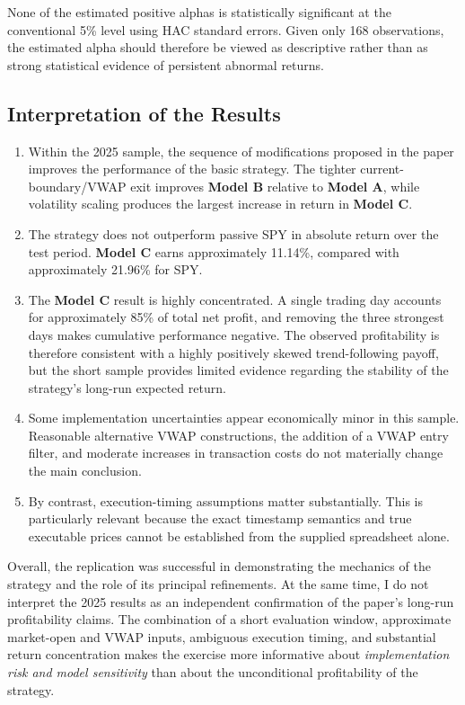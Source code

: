 \documentclass{article}
\begin{document}
None of the estimated positive alphas is statistically significant at the conventional 5\% level using HAC standard errors. Given only 168 observations, the estimated alpha should therefore be viewed as descriptive rather than as strong statistical evidence of persistent abnormal returns.

\subsection{Interpretation of the Results}
\begin{enumerate}
    \item Within the 2025 sample, the sequence of modifications proposed in the paper improves the performance of the basic strategy. The tighter current-boundary/VWAP exit improves\textbf{ Model B} relative to\textbf{ Model A}, while volatility scaling produces the largest increase in return in\textbf{ Model C}.

    \item The strategy does not outperform passive SPY in absolute return over the test period.\textbf{ Model C} earns approximately 11.14\%, compared with approximately 21.96\% for SPY.

    \item The\textbf{ Model C} result is highly concentrated. A single trading day accounts for approximately 85\% of total net profit, and removing the three strongest days makes cumulative performance negative. The observed profitability is therefore consistent with a highly positively skewed trend-following payoff, but the short sample provides limited evidence regarding the stability of the strategy's long-run expected return.

    \item Some implementation uncertainties appear economically minor in this sample. Reasonable alternative VWAP constructions, the addition of a VWAP entry filter, and moderate increases in transaction costs do not materially change the main conclusion.

    \item By contrast, execution-timing assumptions matter substantially. This is particularly relevant because the exact timestamp semantics and true executable prices cannot be established from the supplied spreadsheet alone.
\end{enumerate}

Overall, the replication was successful in demonstrating the mechanics of the strategy and the role of its principal refinements. At the same time, I do not interpret the 2025 results as an independent confirmation of the paper's long-run profitability claims. The combination of a short evaluation window, approximate market-open and VWAP inputs, ambiguous execution timing, and substantial return concentration makes the exercise more informative about \emph{implementation risk and model sensitivity} than about the unconditional profitability of the strategy.
\end{document}
